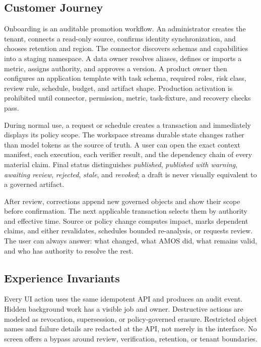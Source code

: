 \documentclass[10pt]{article}
\begin{document}
\subsection{Customer Journey}

Onboarding is an auditable promotion workflow. An administrator creates the tenant, connects a read-only source, confirms identity synchronization, and chooses retention and region. The connector discovers schemas and capabilities into a staging namespace. A data owner resolves aliases, defines or imports a metric, assigns authority, and approves a version. A product owner then configures an application template with task schema, required roles, risk class, review rule, schedule, budget, and artifact shape. Production activation is prohibited until connector, permission, metric, task-fixture, and recovery checks pass.

During normal use, a request or schedule creates a transaction and immediately displays its policy scope. The workspace streams durable state changes rather than model tokens as the source of truth. A user can open the exact context manifest, each execution, each verifier result, and the dependency chain of every material claim. Final status distinguishes \emph{published}, \emph{published with warning}, \emph{awaiting review}, \emph{rejected}, \emph{stale}, and \emph{revoked}; a draft is never visually equivalent to a governed artifact.

After review, corrections append new governed objects and show their scope before confirmation. The next applicable transaction selects them by authority and effective time. Source or policy change computes impact, marks dependent claims, and either revalidates, schedules bounded re-analysis, or requests review. The user can always answer: what changed, what AMOS did, what remains valid, and who has authority to resolve the rest.

\subsection{Experience Invariants}

Every UI action uses the same idempotent API and produces an audit event. Hidden background work has a visible job and owner. Destructive actions are modeled as revocation, supersession, or policy-governed erasure. Restricted object names and failure details are redacted at the API, not merely in the interface. No screen offers a bypass around review, verification, retention, or tenant boundaries.
\end{document}

